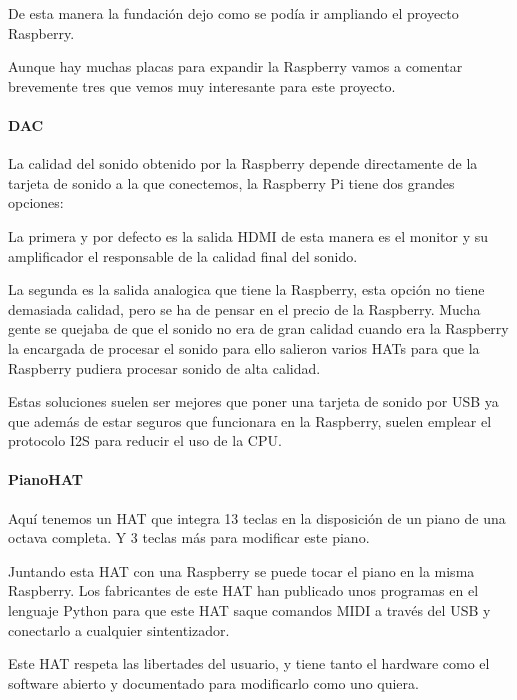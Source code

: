 \documentclass[a4paper,11pt,oneside]{book}
\begin{document}
De esta manera la fundación dejo como se podía ir ampliando el proyecto Raspberry.


Aunque hay muchas placas para expandir la Raspberry vamos a comentar brevemente tres que vemos muy interesante para este proyecto.

\paragraph{DAC}
La calidad del sonido obtenido por la Raspberry depende directamente de la tarjeta de sonido a la que conectemos, la Raspberry Pi tiene dos grandes opciones:

La primera y por defecto es la salida HDMI de esta manera es el monitor y su amplificador el responsable de la calidad final del sonido.

La segunda es la salida analogica que tiene la Raspberry, esta opción no tiene demasiada calidad, pero se ha de pensar en el precio de la Raspberry.
Mucha gente se quejaba de que el sonido no era de gran calidad cuando era la Raspberry la encargada de procesar el sonido para ello salieron varios HATs para que la Raspberry pudiera procesar sonido de alta calidad.

Estas soluciones suelen ser mejores que poner una tarjeta de sonido por USB ya que además de estar seguros que funcionara en la Raspberry, suelen emplear el protocolo I2S para reducir el uso de la CPU.

\paragraph{PianoHAT}

Aquí tenemos un HAT que integra 13 teclas en la disposición de un piano de una octava completa. Y 3 teclas más para modificar este piano.

Juntando esta HAT con una Raspberry se puede tocar el piano en la misma Raspberry. 
Los fabricantes de este HAT han publicado unos programas en el lenguaje Python para que este HAT saque comandos MIDI a través del USB y conectarlo a cualquier sintentizador. 

Este HAT respeta las libertades del usuario, y tiene tanto el hardware como el software abierto y documentado para modificarlo como uno quiera.
\end{document}
